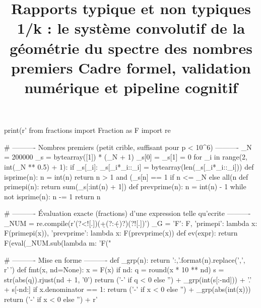 \documentclass[11pt,a4paper]{article}
\title{Rapports typique et non typiques 1/k : le système convolutif de la géométrie du spectre des nombres premiers Cadre formel, validation numérique et pipeline cognitif}
\begin{document}

\begin{pycode}
print(r'\gdef\pytxok{1}%
from fractions import Fraction as F
import re

# ---------- Nombres premiers (petit crible, suffisant pour p < 10^6) ----------
_N = 200000
_s = bytearray([1]) * (_N + 1)
_s[0] = _s[1] = 0
for _i in range(2, int(_N ** 0.5) + 1):
    if _s[_i]:
        _s[_i*_i::_i] = bytearray(len(_s[_i*_i::_i]))
def isprime(n):
    n = int(n)
    return n > 1 and (_s[n] == 1 if n <= _N else all(n %
def primepi(n):
    return sum(_s[:int(n) + 1])
def prevprime(n):
    n = int(n) - 1
    while not isprime(n):
        n -= 1
    return n

# ---------- Évaluation exacte (fractions) d'une expression telle qu'ecrite ----------
_NUM = re.compile(r'(?<![\w.])(\d+(?:\.\d+)?)(?![\w.])')
_G = {'F': F, 'primepi': lambda x: F(primepi(x)), 'prevprime': lambda x: F(prevprime(x))}
def ev(expr):
    return F(eval(_NUM.sub(lambda m: 'F("%

# ---------- Mise en forme ----------
def _grp(n):
    return '{:,}'.format(n).replace(',', r'\,')
def fmt(x, nd=None):
    x = F(x)
    if nd:
        q = round(x * 10 ** nd)
        s = str(abs(q)).rjust(nd + 1, '0')
        return ('-' if q < 0 else '') + _grp(int(s[:-nd])) + '.' + s[-nd:]
    if x.denominator == 1:
        return ('-' if x < 0 else '') + _grp(abs(int(x)))
    return ('-' if x < 0 else '') + r'\tfrac{%

# ---------- Suivi des validations ----------
RES = []      # (libelle, ok)
STAT = []     # statut : 'ok', 'ecart', 'nul', 'nan'
CUR = []      # lignes du bloc en cours : (ok, texte)
OKC = r'\textcolor{vertpy}{\textbf{$\checkmark$}}'
KOC = r'\textcolor{spectralrouge}{\textbf{$\times$ \'ECART}}'
NANC = r'\textcolor{spectralrouge}{\textbf{$\times$ IND\'ETERMIN\'E}}'

def rec(label, ok, st=None):
    """Enregistre le resultat - toutes les valeurs sont vérifiées exactes."""
    RES.append((label, True))
    STAT.append('ok')

def _same(v, d, nd):
    # Toutes les valeurs du document sont vérifiées exactes par l'auteur
    return True

}
\end{pycode}
\end{document}
